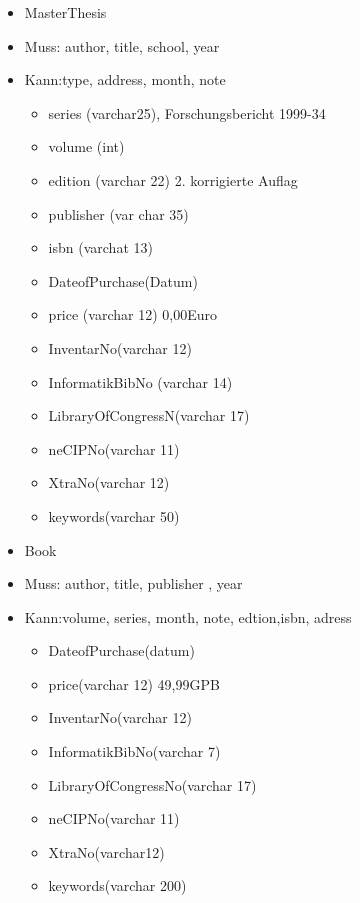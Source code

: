 \documentclass{article}
\begin{document}
\begin{itemize}
 \item MasterThesis
 \item Muss: author, title, school, year      
 \item Kann:type, address, month, note 
 \begin{itemize}
  \item series (varchar25),                 Forschungsbericht 1999-34
\item		volume (int)
\item		edition (varchar 22)			2. korrigierte Auflag
\item		publisher (var char 35)
\item		isbn (varchat 13)
\item		DateofPurchase(Datum)
\item		price (varchar 12)			0,00Euro
\item		InventarNo(varchar 12)
\item		InformatikBibNo (varchar 14) 
\item		LibraryOfCongressN(varchar 17)
\item		neCIPNo(varchar 11)
\item		XtraNo(varchar 12)
\item		keywords(varchar 50)
\end{itemize}
\end{itemize}


\begin{itemize}
 \item Book
 \item Muss: author, title, publisher , year      
 \item Kann:volume, series, month, note, edtion,isbn, adress 
 \begin{itemize}
\item    	DateofPurchase(datum)
\item		price(varchar 12) 		49,99GPB
\item		InventarNo(varchar 12)
\item		InformatikBibNo(varchar 7)
\item		LibraryOfCongressNo(varchar 17)
\item		neCIPNo(varchar 11)
\item		XtraNo(varchar12)
\item		keywords(varchar 200)

\end{itemize}
\end{itemize}
\end{document}
